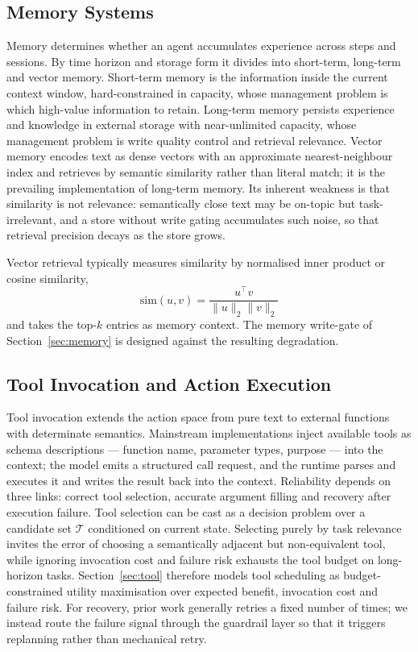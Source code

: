 \documentclass[journal,10pt,a4paper]{IEEEtran}
\begin{document}
\subsection{Memory Systems}
Memory determines whether an agent accumulates experience across steps and sessions. By time horizon and storage form it divides into short-term, long-term and vector memory. Short-term memory is the information inside the current context window, hard-constrained in capacity, whose management problem is which high-value information to retain. Long-term memory persists experience and knowledge in external storage with near-unlimited capacity, whose management problem is write quality control and retrieval relevance. Vector memory encodes text as dense vectors with an approximate nearest-neighbour index and retrieves by semantic similarity rather than literal match; it is the prevailing implementation of long-term memory. Its inherent weakness is that similarity is not relevance: semantically close text may be on-topic but task-irrelevant, and a store without write gating accumulates such noise, so that retrieval precision decays as the store grows.

Vector retrieval typically measures similarity by normalised inner product or cosine similarity,
\begin{equation}
\mathrm{sim}(u,v)=\frac{u^{\top}v}{\lVert u\rVert_2\lVert v\rVert_2}
\end{equation}
and takes the top-$k$ entries as memory context. The memory write-gate of Section~\ref{sec:memory} is designed against the resulting degradation.

\subsection{Tool Invocation and Action Execution}
Tool invocation extends the action space from pure text to external functions with determinate semantics. Mainstream implementations inject available tools as schema descriptions --- function name, parameter types, purpose --- into the context; the model emits a structured call request, and the runtime parses and executes it and writes the result back into the context. Reliability depends on three links: correct tool selection, accurate argument filling and recovery after execution failure. Tool selection can be cast as a decision problem over a candidate set $\mathcal{T}$ conditioned on current state. Selecting purely by task relevance invites the error of choosing a semantically adjacent but non-equivalent tool, while ignoring invocation cost and failure risk exhausts the tool budget on long-horizon tasks. Section~\ref{sec:tool} therefore models tool scheduling as budget-constrained utility maximisation over expected benefit, invocation cost and failure risk. For recovery, prior work generally retries a fixed number of times; we instead route the failure signal through the guardrail layer so that it triggers replanning rather than mechanical retry.
\end{document}
